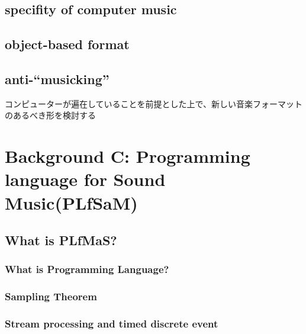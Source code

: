 \hypertarget{specifity-of-computer-music}{%
\section{specifity of computer
music}\label{specifity-of-computer-music}}

\hypertarget{object-based-format}{%
\section{object-based format}\label{object-based-format}}

\hypertarget{anti-musicking}{%
\section{anti-``musicking''}\label{anti-musicking}}

コンピューターが遍在していることを前提とした上で、新しい音楽フォーマットのあるべき形を検討する

\hypertarget{background-c-programming-language-for-sound-musicplfsam}{%
\chapter{Background C: Programming language for Sound
Music(PLfSaM)}\label{background-c-programming-language-for-sound-musicplfsam}}

\hypertarget{what-is-plfmas}{%
\section{What is PLfMaS?}\label{what-is-plfmas}}

\hypertarget{what-is-programming-language}{%
\subsection{What is Programming
Language?}\label{what-is-programming-language}}

\hypertarget{sampling-theorem}{%
\subsection{Sampling Theorem}\label{sampling-theorem}}

\hypertarget{stream-processing-and-timed-discrete-event}{%
\subsection{Stream processing and timed discrete
event}\label{stream-processing-and-timed-discrete-event}}

